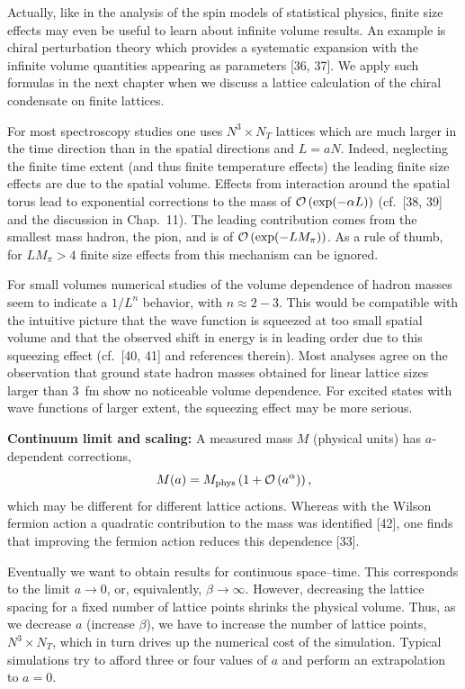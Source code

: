 Actually, like in the analysis of the spin models of statistical physics,
finite size effects may even be useful to learn about infinite volume results.
An example is chiral perturbation theory which provides a systematic expansion
with the infinite volume quantities appearing as parameters [36, 37]. We apply
such formulas in the next chapter when we discuss a lattice calculation of the
chiral condensate on finite lattices.

For most spectroscopy studies one uses $N^3 \times N_T$ lattices which are much
larger in the time direction than in the spatial directions and $L = aN$.
Indeed, neglecting the finite time extent (and thus finite temperature effects)
the leading finite size effects are due to the spatial volume. Effects from
interaction around the spatial torus lead to exponential corrections to the
mass of $\mathcal{O}\left(\exp(-\alpha L)\right)$ (cf.\ [38, 39] and the discussion in
Chap.~11). The leading contribution comes from the smallest mass hadron, the
pion, and is of $\mathcal{O}\left(\exp(-L M_\pi)\right)$. As a rule of thumb, for
$L M_\pi > 4$ finite size effects from this mechanism can be ignored.

For small volumes numerical studies of the volume dependence of hadron masses
seem to indicate a $1/L^n$ behavior, with $n \approx 2{-}3$. This would be
compatible with the intuitive picture that the wave function is squeezed at too
small spatial volume and that the observed shift in energy is in leading order
due to this squeezing effect (cf.\ [40, 41] and references therein). Most
analyses agree on the observation that ground state hadron masses obtained for
linear lattice sizes larger than 3~fm show no noticeable volume dependence. For
excited states with wave functions of larger extent, the squeezing effect may
be more serious.

\textbf{Continuum limit and scaling:} A measured mass $M$ (physical units) has
$a$-dependent corrections,
\begin{equation}
  M(a) = M_{\rm phys}\left( 1 + \mathcal{O}\left(a^\alpha\right) \right),
\end{equation}
which may be different for different lattice actions. Whereas with the Wilson
fermion action a quadratic contribution to the mass was identified [42], one
finds that improving the fermion action reduces this dependence [33].

Eventually we want to obtain results for continuous space--time. This
corresponds to the limit $a \to 0$, or, equivalently, $\beta \to \infty$.
However, decreasing the lattice spacing for a fixed number of lattice points
shrinks the physical volume. Thus, as we decrease $a$ (increase $\beta$), we
have to increase the number of lattice points, $N^3 \times N_T$, which in turn
drives up the numerical cost of the simulation. Typical simulations try to
afford three or four values of $a$ and perform an extrapolation to $a = 0$.

